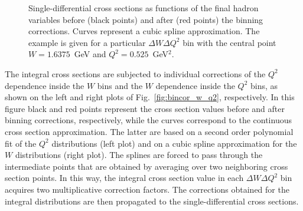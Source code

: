 \begin{figure}[htp]
\begin{center}
\caption{\small Single-differential cross sections as functions of the final hadron variables before (black points) and after (red points) the binning corrections. Curves represent a cubic spline approximation. The example is given for a particular $\Delta W \Delta Q^{2}$ bin with the central point $W=1.6375$~GeV and $Q^{2}=0.525$~GeV$^{2}$.  } \label{fig:bin_cor_1d}
\end{center}
\end{figure}


The integral cross sections are subjected to individual corrections of the $Q^{2}$ dependence inside the $W$ bins and the $W$ dependence inside the $Q^{2}$ bins, as shown on the left and right plots of Fig.~\ref{fig:bincor_w_q2}, respectively. In this figure black and red points represent the cross section values before and after binning corrections, respectively, while the curves correspond to the continuous cross section approximation. The latter are based on a second order polynomial fit of the $Q^{2}$ distributions (left plot) and on a cubic spline approximation for the $W$ distributions (right plot). The splines are forced to pass through the intermediate points that are obtained by averaging over two neighboring cross section points. In this way, the integral cross section value in each $\Delta W\Delta Q^{2}$ bin acquires two multiplicative correction factors. The corrections obtained for the integral distributions are then propagated to the single-differential cross sections.

